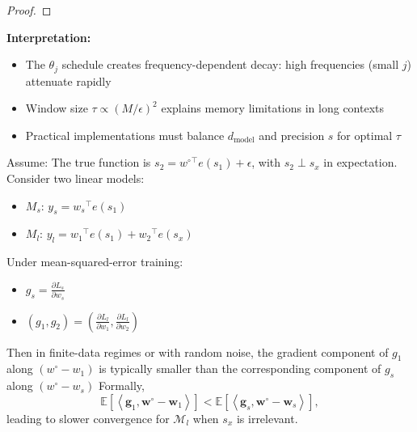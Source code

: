 \begin{theorem}
\begin{proof}
\end{proof}

\textbf{Interpretation:}
\begin{itemize}
\item The $\theta_j$ schedule creates frequency-dependent decay: high frequencies (small $j$) attenuate rapidly
\item Window size $\tau \propto (M/\epsilon)^2$ explains memory limitations in long contexts
\item Practical implementations must balance $d_{\text{model}}$ and precision $s$ for optimal $\tau$
\end{itemize}
\end{theorem}

\begin{theorem}
\label{thm: Recap 2}
Assume: The true function is $s_2 = {w^{\circ}}^{\top} e(s_1) + \epsilon$, with $s_2 \perp s_x$ in expectation.
Consider two linear models:
\begin{itemize}
\item $M_s$: $y_s = {w_s}^{\top} e(s_1)$
\item $M_l$: $y_l = {w_1}^{\top} e(s_1) + {w_2}^{\top} e(s_x)$
\end{itemize}
Under mean-squared-error training:
\begin{itemize}
\item $g_s = \frac{\partial L_s}{\partial w_s}$
\item $(g_1, g_2) = \left(\frac{\partial L_l}{\partial w_1}, \frac{\partial L_l}{\partial w_2}\right)$
\end{itemize}
Then in finite-data regimes or with random noise, the gradient component of $g_1$ along $(w^{\circ} - w_1)$ is typically smaller than the corresponding component of $g_s$ along $(w^{\circ} - w_s)$
Formally,
\[
\mathbb{E}\left[ \left\langle \mathbf{g}_1, \mathbf{w}^\circ - \mathbf{w}_1 \right\rangle \right] < \mathbb{E}\left[ \left\langle \mathbf{g}_s, \mathbf{w}^\circ - \mathbf{w}_s \right\rangle \right],
\]
leading to slower convergence for \( \mathcal{M}_{l} \) when \( s_{x} \) is irrelevant.
\end{theorem}
%

